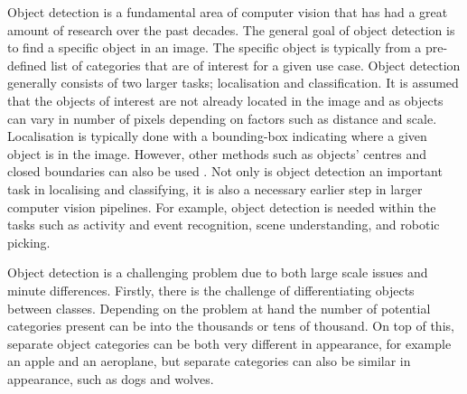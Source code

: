 \begin{comment}
	- fundamental problem in CV
		- much work over previous decades
	- goal: find specific category in a given image
		- of interest by itself. Localise and classification
		- also a pre-requisite step to higher-level vision tasks
			- activity & event recognition, scene understanding, + find more
	- difficulties 
		- inter-class differences small
		- intra-class variations large
			- shape, pose, colour, texture, background, differences in illumination/viewpoint etc between images
	- GPU/deep learning advances have meant that performance is starting to become satisfactory for real-world use in scenarios requiring high precision and accuracy
		- autonomous vehicles, military, medicinal
	- much discussion of AI taking labor jobs
		- find articles and specific examples
			- elon musk, bill gates, etc (leaders of tech)
		- object detection needed
		- improvements still to be made before being completely realised
	- next section, overview of object detection definition, key task and challenges within. Also SOTA related work
\end{comment}


Object detection is a fundamental area of computer vision that has had a great amount of research over the past decades. The general goal of object detection is to find a specific object in an image. The specific object is typically from a pre-defined list of categories that are of interest for a given use case. Object detection generally consists of two larger tasks; localisation and classification. It is assumed that the objects of interest are not already located in the image and as objects can vary in number of pixels depending on factors such as distance and scale. Localisation is typically done with a bounding-box indicating where a given object is in the image. However, other methods such as objects' centres and closed boundaries can also be used \cite{zhang}. Not only is object detection an important task in localising and classifying, it is also a necessary earlier step in larger computer vision pipelines. For example, object detection is needed within the tasks such as activity and event recognition, scene understanding, and robotic picking.

Object detection is a challenging problem due to both large scale issues and minute differences. Firstly, there is the challenge of differentiating objects between classes. Depending on the problem at hand the number of potential categories present can be into the thousands or tens of thousand. On top of this, separate object categories can be both very different in appearance, for example an apple and an aeroplane, but separate categories can also be similar in appearance, such as dogs and wolves.


